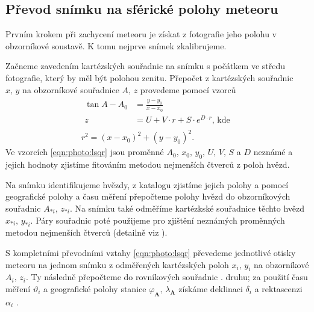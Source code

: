 \subsection{Převod snímku na sférické polohy meteoru}
Prvním krokem při zachycení meteoru je získat z fotografie jeho polohu v obzorníkové soustavě. K tomu nejprve snímek zkalibrujeme.

Začneme zavedením kartézských souřadnic na snímku s počátkem ve středu fotografie, který by měl být polohou zenitu. Přepočet z kartézských souřadnic $x,\,y$ na obzorníkové souřadnice $A,\,z$ provedeme pomocí vzorců \cite{ceplecha}
\begin{eqnarray}
    \begin{aligned}
        \tan{A-A_0} & =\frac{y-y_0}{x-x_0}                        \\
        z           & =U+V\cdot r+S\cdot e^{D\cdot r}\text{, kde}
    \end{aligned}\label{eqn:photo:lsqr}\\
    r^2=(x-x_0)^2+(y-y_0)^2\text{.}
\end{eqnarray}
Ve vzorcích \eqref{eqn:photo:lsqr} jsou proměnné $A_0,\,x_0,\,y_0,\,U,\,V,\,S$ a $D$ neznámé a jejich hodnoty zjistíme fitováním metodou nejmenších čtverců z poloh hvězd.

Na snímku identifikujeme hvězdy, z katalogu zjistíme jejich polohy a pomocí geografické polohy a času měření přepočteme polohy hvězd do obzorníkových souřadnic $A_{\ast i},\,z_{\ast i}$. Na snímku také odměříme kartézkské souřadnice těchto hvězd $x_{\ast i},\,y_{\ast i}$. Páry souřadnic poté použijeme pro zjištění neznámých proměnných metodou nejmenších čtverců (detailně viz \cite[223--224]{ceplecha}).

S kompletními převodními vztahy \eqref{eqn:photo:lsqr} převedeme jednotlivé otisky meteoru na jednom snímku z odměřených kartézských poloh $x_i,\,y_i$ na obzorníkové $A_i,\,z_i$. Ty následně přepočteme do rovníkových souřadnic {\uppercase\expandafter{\relax}}. druhu; za použití času měření $\vartheta_i$ a geografické polohy stanice $\varphi_\mathbf{A},\,\lambda_\mathbf{A}$ získáme deklinaci $\delta_i$ a rektascenzi $\alpha_i$ \cite{ceplecha}.

